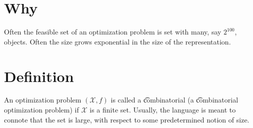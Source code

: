 
\section*{Why}

Often the feasible set of an optimization problem is set with many, say $2^{100}$, objects.
Often the size grows exponential in the size of the representation.

\section*{Definition}

An optimization problem $(\mathcal{X} , f)$ is called a \t{combinatorial} (a \t{combinatorial optimization problem}) if $\mathcal{X} $ is a finite set.
Usually, the language is meant to connote that the set is large, with respect to some predetermined notion of size.

\blankpage
